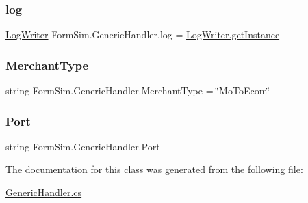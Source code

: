 \subsubsection{\texorpdfstring{log}{log}}
{\footnotesize\ttfamily \mbox{\hyperlink{class_form_sim_1_1_log_writer}{Log\+Writer}} Form\+Sim.\+Generic\+Handler.\+log = \mbox{\hyperlink{class_form_sim_1_1_log_writer_ac885dc41c236f618e066cdcee8189f64}{Log\+Writer.\+get\+Instance}}\hspace{0.3cm}{\ttfamily [protected]}}

\mbox{\label{class_form_sim_1_1_generic_handler_a8b7d568966660d7d3700eac963caa504}} 
\subsubsection{\texorpdfstring{Merchant\+Type}{MerchantType}}
{\footnotesize\ttfamily string Form\+Sim.\+Generic\+Handler.\+Merchant\+Type = \char`\"{}Mo\+To\+Ecom\char`\"{}\hspace{0.3cm}{\ttfamily [protected]}}

\mbox{\label{class_form_sim_1_1_generic_handler_ac6492bb3e4fbe8f66c97b00bd27020c1}} 
\subsubsection{\texorpdfstring{Port}{Port}}
{\footnotesize\ttfamily string Form\+Sim.\+Generic\+Handler.\+Port\hspace{0.3cm}{\ttfamily [protected]}}



The documentation for this class was generated from the following file\+:\begin{DoxyCompactItemize}
\item 
\mbox{\hyperlink{_generic_handler_8cs}{Generic\+Handler.\+cs}}\end{DoxyCompactItemize}

